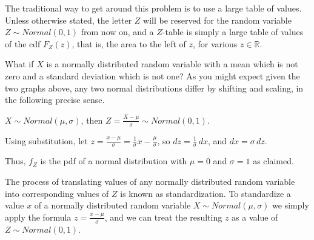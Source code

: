 \par
The traditional way to get around this problem is to use a large table of values. Unless otherwise stated, the letter $Z$ will be reserved for the random variable $Z \sim Normal(0,1)$ from now on, and a $Z$-table is simply a large table of values of the cdf $F_Z(z) $, that is, the area to the left of $z$, for various $z \in \mathbb{R}$.
\par
What if $X$ is a normally distributed random variable with a mean which is not zero and a standard deviation which is not one? As you might expect given the two graphs above, any two normal distributions differ by shifting and scaling, in the following precise sense.
\begin{prop}$X \sim Normal (\mu,\sigma)$, then $Z = \frac{X - \mu}{\sigma} \sim Normal(0,1)$.
\end{prop}
\begin{pf}
Using substitution, let $z = \frac{x - \mu}{\sigma} = \frac{1}{\sigma}x - \frac{\mu}{\sigma}$, so $dz = \frac{1}{\sigma}\,dx$, and $dx = \sigma \, dz$. 
\par
\noindent Thus, $f_Z$ is the pdf of a normal distribution with $\mu = 0$ and $\sigma = 1$ as claimed.
\end{pf}
\par
The process of translating values of any normally distributed random variable into corresponding values of $Z$ is known as standardization. To standardize a value $x$ of a normally distributed random variable $X \sim Normal(\mu, \sigma)$ we simply apply the formula $z  = \frac{x - \mu}{\sigma}$, and we can treat the resulting $z$ as a value of $Z \sim Normal(0, 1)$.
